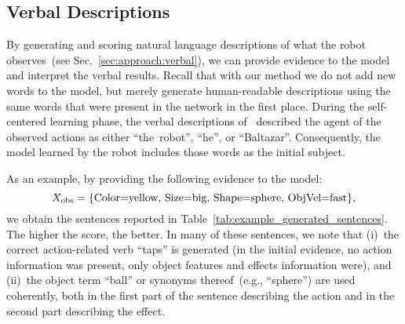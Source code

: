 \subsection{Verbal Descriptions}


By generating and scoring natural language descriptions of what the robot observes~(see Sec.~\ref{sec:approach:verbal}), we can provide evidence to the model and interpret the verbal results.
Recall that with our method we do not add new words to the model, but merely generate human-readable descriptions using the same words that were present in the \AffWords{} network in the first place.
During the self-centered learning phase, the verbal descriptions of~\cite{salvi:2012:smcb} described the agent of the observed actions as either ``the~robot'', ``he'', or ``Baltazar''.
Consequently, the \AffWords{} model learned by the robot includes those words as the initial subject.

As an example, by providing the following evidence to the model:
\begin{equation} \label{eq:evidence_example}
    \xobs = \{\text{Color=yellow, Size=big, Shape=sphere, ObjVel=fast}\},
\end{equation}
we obtain
the sentences reported in Table~\ref{tab:example_generated_sentences}.
The higher the score, the better.
In many of these sentences, we note that (i)~the correct action-related verb ``taps'' is generated (in the initial evidence, no action information was present, only object features and effects information were), and (ii)~the object term ``ball'' or synonyms thereof~(e.g., ``sphere'') are used coherently, both in the first part of the sentence describing the action and in the second part describing the effect.


